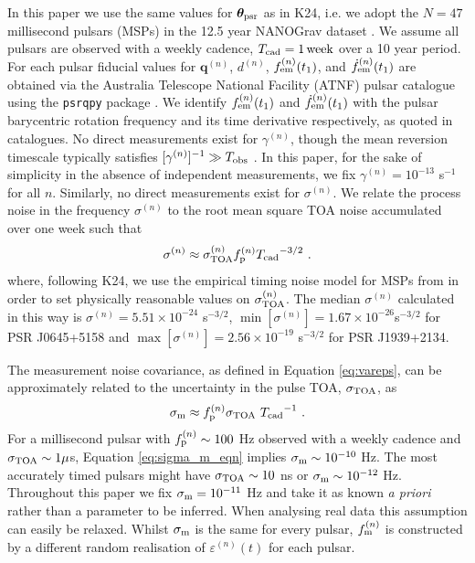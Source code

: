 \documentclass[fleqn,usenatbib,useAMS]{mnras}
\begin{document}
In this paper we use the same values for $\boldsymbol{\theta}_{\rm psr}$ as in K24, i.e. we adopt the $N=47$ millisecond pulsars (MSPs) in the 12.5 year NANOGrav dataset \citep{2020ApJ...905L..34A}. We assume all pulsars are observed with a weekly cadence, $T_{\rm cad} = 1 \,{\rm week}$ over a 10 year period. For each pulsar fiducial values for ${\boldsymbol{q}}^{(n)}$, $d^{(n)}$, $f_{\rm em}^{(n)}(t_1)$, and $\dot{f}^{(n)}_{\rm em}(t_1)$ are obtained via the Australia Telescope National Facility (ATNF) pulsar catalogue \citep{Manchester2005} using the \texttt{psrqpy} package \citep{psrqpy}. We identify $f_{\rm em}^{(n)} (t_1)$ and $\dot{f}_{\rm em}^{(n)} (t_1)$ with the pulsar barycentric rotation frequency and its time derivative respectively, as quoted in catalogues. No direct measurements exist for $\gamma^{(n)}$, though the mean reversion timescale typically satisfies $[\gamma^{(n)}]^{-1} \gg T_{\rm obs}$ \citep{Price2012,Myers2021MNRAS.502.3113M,Meyers2021,Vargas}. In this paper, for the sake of simplicity in the absence of independent measurements, we fix $\gamma^{(n)} = 10^{-13}$ s$^{-1}$ for all $n$. Similarly, no direct measurements exist for $\sigma^{(n)}$.   We relate the process noise in the frequency $\sigma^{(n)}$ to the root mean square TOA noise accumulated over one week such that
\begin{eqnarray}
	\sigma^{(n)} \approx \sigma_{\rm TOA}^{(n)} f_{\rm p}^{(n)} {T_{\rm cad}}^{-3/2} \ . \label{eq:sigmap_f}
\end{eqnarray}
where, following K24, we use the empirical timing noise model for MSPs from \cite{Shannon2010ApJ...725.1607S} in order to set physically reasonable values on $\sigma_{\rm TOA}^{(n)}$.  The median $\sigma^{(n)}$ calculated in this way is $\sigma^{(n)} = 5.51 \times 10^{-24} $ s$^{-3/2}$, $\min [ \sigma^{(n)} ] = 1.67 \times 10^{-26}$s$^{-3/2}$ for PSR J0645+5158 and $\max [ \sigma^{(n)} ] = 2.56 \times 10^{-19}$ s$^{-3/2}$ for PSR J1939+2134. \newline 


The measurement noise covariance, as defined in Equation \eqref{eq:vareps}, can be approximately related to the uncertainty in the pulse TOA, $\sigma_{\rm TOA}$, as
\begin{equation}
	\sigma_{\rm m} \approx f_{\rm p}^{(n)} \sigma_{\rm TOA} \ {T_{\rm cad}}^{-1} \ . \label{eq:sigma_m_eqn}
\end{equation}
For a millisecond pulsar with $f_{\rm p}^{(n)} \sim 100$ Hz observed with a weekly cadence and $\sigma_{\rm TOA} \sim 1 \mu$s,  Equation \eqref{eq:sigma_m_eqn} implies $\sigma_{\rm m} \sim 10^{-10}$ Hz. The most accurately timed pulsars might have $\sigma_{\rm TOA} \sim 10 $ ns or $\sigma_{\rm m} \sim 10^{-12}$ Hz. Throughout this paper we fix $\sigma_{\rm m} = 10^{-11}$ Hz and take it as known \textit{a priori} rather than a parameter to be inferred. When analysing real data this assumption can easily be relaxed. Whilst $\sigma_{\rm m}$ is the same for every pulsar, $f_{\rm m} ^{(n)}$ is constructed by a different random realisation of $\varepsilon^{(n)}(t)$ for each pulsar. \newline  
\end{document}
